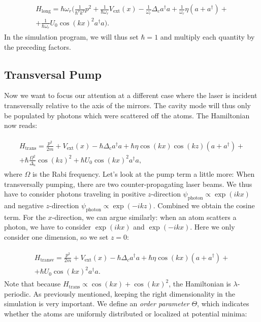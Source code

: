 \begin{align}
\begin{split}
H_\text{long} = \hbar \omega_r \biggl( \frac{1}{\hbar^2 k^2} p^2 + \frac{1}{\hbar \omega_r} V_\text{ext}(x) - \frac{1}{\omega_r} \Delta_c a^\dagger a + \frac{1}{\omega_r} \eta (a + a^\dagger) + \\
 + \frac{1}{\hbar \omega_r} U_0 \cos(kx)^2 a^\dagger a \biggr).
\end{split}
\end{align}In the simulation program, we will thus set $\hbar = 1$ and multiply each quantity by the preceding factors.

\subsection{Transversal Pump}

Now we want to focus our attention at a different case where the laser is incident transversally relative to the axis of the mirrors. The cavity mode will thus only be populated by photons which were scattered off the atoms. The Hamiltonian now reads:

\begin{align}
\begin{split}
H_\text{trans} = \frac{p^2}{2m} + V_\text{ext}(x) - \hbar \Delta_\text{c} a^\dagger a  + \hbar \eta \cos(kx) \cos(kz) (a + a^\dagger) + \\
+ \hbar \frac{\Omega^2}{\Delta_\text{a}} \cos(kz)^2 + \hbar U_0 \cos(kx)^2 a^\dagger a,
\end{split}
\end{align}where $\Omega$ is the Rabi frequency. Let's look at the pump term a little more: When transversally pumping, there are two counter-propagating laser beams. We thus have to consider photons traveling in positive $z$-direction $\psi_\text{photon} \propto \exp(ikx)$ and negative $z$-direction $\psi_\text{photon} \propto \exp(-ikz)$. Combined we obtain the cosine term. For the $x$-direction, we can argue similarly: when an atom scatters a photon, we have to consider $\exp(ikx)$ and $\exp(-ikx)$. Here we only consider one dimension, so we set $z=0$:

\begin{align}
\begin{split}
H_\text{transv} = \frac{p^2}{2m} + V_\text{ext}(x) - \hbar \Delta_c a^\dagger a + \hbar \eta \cos(kx) (a + a^\dagger) + \\
 + \hbar U_0 \cos(kx)^2 a^\dagger a.
\end{split}
\end{align}Note that because $H_\text{trans} \propto \cos(kx) + \cos(kx)^2$, the Hamiltonian is $\lambda$-periodic. As previously mentioned, keeping the right dimensionality in the simulation is very important. We define an \textit{order parameter} $\Theta$, which indicates whether the atoms are uniformly distributed or localized at potential minima:

